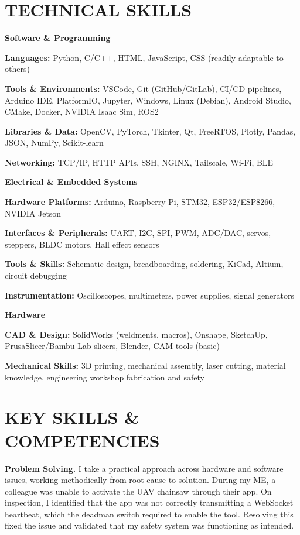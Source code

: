 \documentclass[11pt, a4paper]{article}
\newcommand{\skillrow}[2]{%
  \noindent\textbf{#1:} #2\par\vspace{2pt}%
}
\begin{document}
\section{TECHNICAL SKILLS}

\textbf{Software \& Programming}
\vspace{2pt}

\skillrow{Languages}{Python, C/C++, HTML, JavaScript, CSS (readily adaptable to others)}
\skillrow{Tools \& Environments}{VSCode, Git (GitHub/GitLab), CI/CD pipelines, Arduino
  IDE, PlatformIO, Jupyter, Windows, Linux (Debian), Android Studio, CMake, Docker,
  NVIDIA Isaac Sim, ROS2}
\skillrow{Libraries \& Data}{OpenCV, PyTorch, Tkinter, Qt, FreeRTOS, Plotly, Pandas,
  JSON, NumPy, Scikit-learn}
\skillrow{Networking}{TCP/IP, HTTP APIs, SSH, NGINX, Tailscale, Wi-Fi, BLE}

\vspace{4pt}
\textbf{Electrical \& Embedded Systems}
\vspace{2pt}

\skillrow{Hardware Platforms}{Arduino, Raspberry Pi, STM32, ESP32/ESP8266, NVIDIA Jetson}
\skillrow{Interfaces \& Peripherals}{UART, I2C, SPI, PWM, ADC/DAC, servos, steppers,
  BLDC motors, Hall effect sensors}
\skillrow{Tools \& Skills}{Schematic design, breadboarding, soldering, KiCad, Altium,
  circuit debugging}
\skillrow{Instrumentation}{Oscilloscopes, multimeters, power supplies, signal generators}

\vspace{4pt}
\textbf{Hardware}
\vspace{2pt}

\skillrow{CAD \& Design}{SolidWorks (weldments, macros), Onshape, SketchUp,
  PrusaSlicer/Bambu Lab slicers, Blender, CAM tools (basic)}
\skillrow{Mechanical Skills}{3D printing, mechanical assembly, laser cutting, material
  knowledge, engineering workshop fabrication and safety}

\section{KEY SKILLS \& COMPETENCIES}

\textbf{Problem Solving.}\enspace
I take a practical approach across hardware and software issues, working methodically from
root cause to solution. During my ME, a colleague was unable to activate the UAV chainsaw
through their app. On inspection, I identified that the app was not correctly transmitting
a WebSocket heartbeat, which the deadman switch required to enable the tool. Resolving this
fixed the issue and validated that my safety system was functioning as intended.
\end{document}
